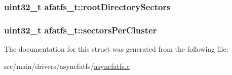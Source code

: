 \hypertarget{structafatfs__t_a3a57b49090ab8dcd151e317038239e67}{
\subsubsection[{root\+Directory\+Sectors}]{\setlength{\rightskip}{0pt plus 5cm}uint32\+\_\+t afatfs\+\_\+t\+::root\+Directory\+Sectors}}\label{structafatfs__t_a3a57b49090ab8dcd151e317038239e67}
\hypertarget{structafatfs__t_a93c9fdb3a6f2d4f833ff0afe0779af8d}{
\subsubsection[{sectors\+Per\+Cluster}]{\setlength{\rightskip}{0pt plus 5cm}uint32\+\_\+t afatfs\+\_\+t\+::sectors\+Per\+Cluster}}\label{structafatfs__t_a93c9fdb3a6f2d4f833ff0afe0779af8d}


The documentation for this struct was generated from the following file\+:\begin{DoxyCompactItemize}
\item 
src/main/drivers/asyncfatfs/\hyperlink{asyncfatfs_8c}{asyncfatfs.\+c}\end{DoxyCompactItemize}
